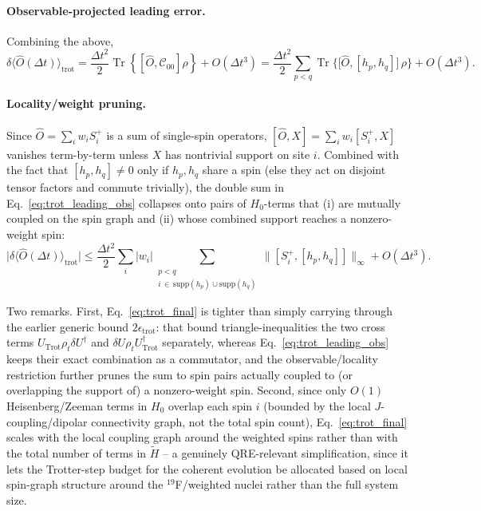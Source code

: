 \documentclass[11pt]{article}
\newcommand{\Dt}{\Delta t}
\newcommand{\calC}{\mathcal{C}}
\newcommand{\rhot}{\rho_t}
\DeclareMathOperator{\Tr}{Tr}
\begin{document}
\paragraph{Observable-projected leading error.} Combining the above,
\begin{equation}\label{eq:trot_leading_obs}
    \delta\langle\hat{O}(\Dt)\rangle_{\text{trot}} = \frac{\Dt^2}{2}\Tr\left\{\left[\hat{O},\calC_{00}\right]\rho\right\}+O(\Dt^3) = \frac{\Dt^2}{2}\sum_{p<q}\Tr\Big\{\big[\hat{O},[h_p,h_q]\big]\,\rho\Big\}+O(\Dt^3).
\end{equation}

\paragraph{Locality/weight pruning.} Since $\hat{O}=\sum_iw_iS_i^+$ is a sum of single-spin operators, $[\hat{O},X]=\sum_iw_i[S_i^+,X]$ vanishes term-by-term unless $X$ has nontrivial support on site $i$. Combined with the fact that $[h_p,h_q]\neq0$ only if $h_p,h_q$ share a spin (else they act on disjoint tensor factors and commute trivially), the double sum in Eq.~\eqref{eq:trot_leading_obs} collapses onto pairs of $H_0$-terms that (i) are mutually coupled on the spin graph and (ii) whose combined support reaches a nonzero-weight spin:
\begin{equation}\label{eq:trot_final}
    \big|\delta\langle\hat{O}(\Dt)\rangle_{\text{trot}}\big| \le \frac{\Dt^2}{2}\sum_i|w_i|\!\!\!\sum_{\substack{p<q\\ i\,\in\,\mathrm{supp}(h_p)\cup\mathrm{supp}(h_q)}}\!\!\!\big\|[S_i^+,[h_p,h_q]]\big\|_\infty+O(\Dt^3).
\end{equation}

Two remarks. First, Eq.~\eqref{eq:trot_final} is tighter than simply carrying through the earlier generic bound $2\epsilon_{\text{trot}}$: that bound triangle-inequalities the two cross terms $U_{\text{Trot}}\rhot\delta U^\dagger$ and $\delta U\rhot U_{\text{Trot}}^\dagger$ separately, whereas Eq.~\eqref{eq:trot_leading_obs} keeps their exact combination as a commutator, and the observable/locality restriction further prunes the sum to spin pairs actually coupled to (or overlapping the support of) a nonzero-weight spin. Second, since only $O(1)$ Heisenberg/Zeeman terms in $H_0$ overlap each spin $i$ (bounded by the local $J$-coupling/dipolar connectivity graph, not the total spin count), Eq.~\eqref{eq:trot_final} scales with the local coupling graph around the weighted spins rather than with the total number of terms in $\tilde{H}$ -- a genuinely QRE-relevant simplification, since it lets the Trotter-step budget for the coherent evolution be allocated based on local spin-graph structure around the $^{19}$F/weighted nuclei rather than the full system size.
\end{document}
